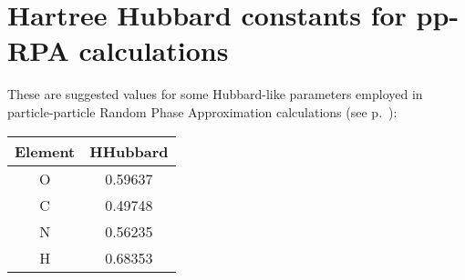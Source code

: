 \chapter{Hartree Hubbard constants for pp-RPA calculations}
\label{app:hhubbard}

These are suggested values for some Hubbard-like parameters employed in
particle-particle Random Phase Approximation calculations (see
p.~):

\begin{center}
\begin{tabular}{cc} \hline
Element & HHubbard \\
\hline
O & 0.59637 \\
C & 0.49748 \\
N & 0.56235 \\
H & 0.68353 \\
\hline
\end{tabular}
\end{center}
